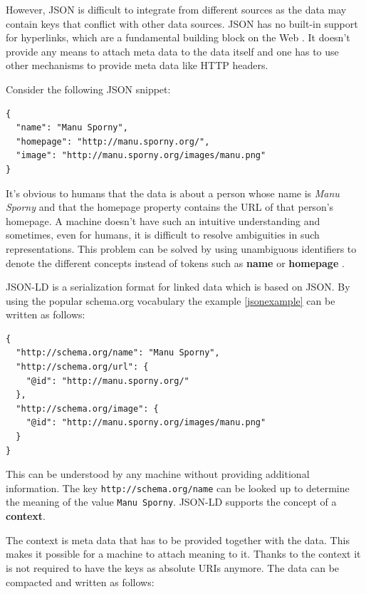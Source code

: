 However, JSON is difficult to integrate from different sources as the data may contain keys that conflict with other data sources. JSON has no built-in support for hyperlinks, which are a fundamental building block on the Web \citep{jsonldbasicconcepts}. It doesn't provide any means to attach meta data to the data itself and one has to use other mechanisms to provide meta data like HTTP headers.

Consider the following JSON snippet:

\lstset{language=JSON}
\begin{lstlisting}[caption=Data of a person in the JSON format, label=jsonexample]
{
  "name": "Manu Sporny",
  "homepage": "http://manu.sporny.org/",
  "image": "http://manu.sporny.org/images/manu.png"
}
\end{lstlisting}

It's obvious to humans that the data is about a person whose name is \textit{Manu Sporny} and that the homepage property contains the URL of that person's homepage. A machine doesn't have such an intuitive understanding and sometimes, even for humans, it is difficult to resolve ambiguities in such representations. This problem can be solved by using unambiguous identifiers to denote the different concepts instead of tokens such as \textbf{name} or \textbf{homepage} \citep{jsonldbasicconcepts}.

JSON-LD is a serialization format for linked data which is based on JSON. By using the popular schema.org vocabulary the example \ref{jsonexample} can be written as follows:

\lstset{language=JSON}
\begin{lstlisting}[caption=Data of a person in the JSON-LD format, label=jsonldexample]
{
  "http://schema.org/name": "Manu Sporny",
  "http://schema.org/url": {
    "@id": "http://manu.sporny.org/"
  },
  "http://schema.org/image": {
    "@id": "http://manu.sporny.org/images/manu.png"
  }
}
\end{lstlisting}

This can be understood by any machine without providing additional information. The key \lstinline{http://schema.org/name} can be looked up to determine the meaning of the value \lstinline{Manu Sporny}. JSON-LD supports the concept of a \textbf{context}.

The context is meta data that has to be provided together with the data. This makes it possible for a machine to attach meaning to it. Thanks to the context it is not required to have the keys as absolute URIs anymore. The data can be compacted and written as follows:

